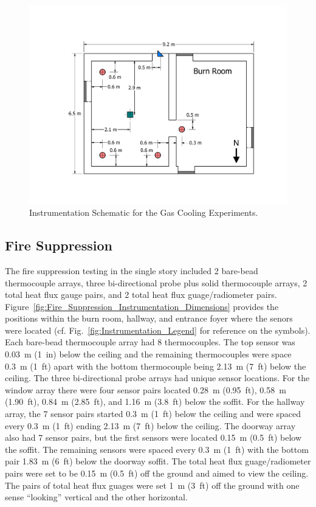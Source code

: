 \documentclass[12pt,oneside]{book}
\begin{document}
\begin{figure}[!ht]
	\includegraphics[width=\columnwidth]{../Figures/Floor_Plans/PDFs/West_Structure/DelCo_2012_West_Structure_Instrumentation}
	\caption{Instrumentation Schematic for the Gas Cooling Experiments.}
	\label{fig:Gas_Cooling_Instrumentation_Dimensions}
\end{figure}

\clearpage

\subsection{Fire Suppression}
\label{subsec:Fire_Suppression_Instrumentation}

The fire suppression testing in the single story included 2 bare-bead thermocouple arrays, three bi-directional probe plus solid thermocouple arrays, 2 total heat flux gauge pairs, and 2 total heat flux guage/radiometer pairs. Figure~\ref{fig:Fire_Suppression_Instrumentation_Dimensions} provides the positions within the burn room, hallway, and entrance foyer where the senors were located (cf. Fig.~\ref{fig:Instrumentation_Legend} for reference on the symbols). Each bare-bead thermocouple array had 8 thermocouples. The top sensor was 0.03~m (1~in) below the ceiling and the remaining thermocouples were space 0.3~m (1~ft) apart with the bottom thermocouple being 2.13~m (7~ft) below the ceiling. The three bi-directional probe arrays had unique sensor locations. For the window array there were four sensor pairs located 0.28~m (0.95~ft), 0.58~m (1.90~ft), 0.84~m (2.85~ft), and 1.16~m (3.8~ft) below the soffit. For the hallway array, the 7 sensor pairs started 0.3~m (1~ft) below the ceiling and were spaced every 0.3~m (1~ft) ending 2.13~m (7~ft) below the ceiling. The doorway array also had 7 sensor pairs, but the first sensors were located 0.15~m (0.5~ft) below the soffit. The remaining sensors were spaced every 0.3~m (1~ft) with the bottom pair 1.83~m (6~ft) below the doorway soffit. The total heat flux guage/radiometer pairs were set to be 0.15~m (0.5~ft) off the ground and aimed to view the ceiling. The pairs of total heat flux guages were set 1~m (3~ft) off the ground with one sense ``looking'' vertical and the other horizontal.
\end{document}

